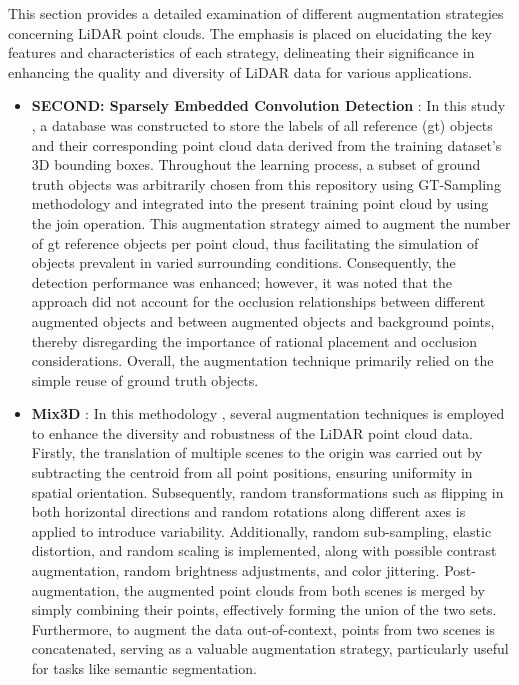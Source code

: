 This section provides a detailed examination of different augmentation strategies concerning LiDAR point clouds. The emphasis is placed on elucidating the key features and characteristics of each strategy, delineating their significance in enhancing the quality and diversity of LiDAR data for various applications. 
\begin{itemize}
    \item \textbf{SECOND: Sparsely Embedded Convolution Detection} : In this study \parencite{second2018}, a database was constructed to store the labels of all reference (\acrshort{gt}) objects and their corresponding point cloud data derived from the training dataset's 3D bounding boxes. Throughout the learning process, a subset of ground truth objects was arbitrarily chosen from this repository using GT-Sampling methodology and integrated into the present training point cloud by using the join operation. This augmentation strategy aimed to augment the number of \acrshort{gt} reference objects per point cloud, thus facilitating the simulation of objects prevalent in varied surrounding conditions. Consequently, the detection performance was enhanced; however, it was noted that the approach did not account for the occlusion relationships between different augmented objects and between augmented objects and background points, thereby disregarding the importance of rational placement and occlusion considerations. Overall, the augmentation technique primarily relied on the simple reuse of ground truth objects.
    \item \textbf{Mix3D} : In this methodology \parencite{mix3d2021}, several augmentation techniques is employed to enhance the diversity and robustness of the LiDAR point cloud data. Firstly, the translation of multiple scenes to the origin was carried out by subtracting the centroid from all point positions, ensuring uniformity in spatial orientation. Subsequently, random transformations such as flipping in both horizontal directions and random rotations along different axes is applied to introduce variability. Additionally, random sub-sampling, elastic distortion, and random scaling is implemented, along with possible contrast augmentation, random brightness adjustments, and color jittering. Post-augmentation, the augmented point clouds from both scenes is merged by simply combining their points, effectively forming the union of the two sets. Furthermore, to augment the data out-of-context, points from two scenes is concatenated, serving as a valuable augmentation strategy, particularly useful for tasks like semantic segmentation.

\end{itemize}
